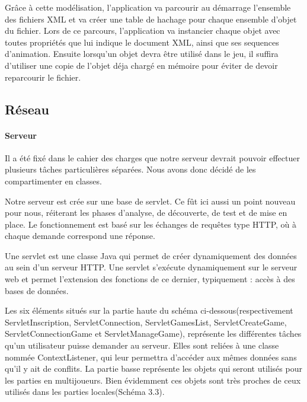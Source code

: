 		Grâce à cette modélisation, l'application va parcourir au démarrage l'ensemble des fichiers XML et va créer une table de hachage pour chaque ensemble d'objet du fichier. Lors de ce parcours, l'application va instancier chaque objet avec toutes propriétés que lui indique le document XML, ainsi que ses sequences d'animation. Ensuite lorsqu'un objet devra être utilisé dans le jeu, il suffira d'utiliser une copie de l'objet déja chargé en mémoire pour éviter de devoir reparcourir le fichier.


\subsection{Réseau}
		
	\paragraph{Serveur\\}
			
		Il a été fixé dans le cahier des charges que notre serveur devrait pouvoir
		effectuer plusieurs tâches particulières séparées. Nous avons donc décidé de
		les compartimenter en classes.
		
		Notre serveur est crée sur une base de servlet. Ce fût ici
		aussi un point nouveau pour nous, réiterant les phases d'analyse, de
		découverte, de test et de mise en place. Le fonctionnement est basé sur les
		échanges de requêtes type HTTP, où à chaque demande correspond une réponse. 
		
		Une servlet est une classe Java qui permet de créer dynamiquement des données
		au sein d'un serveur HTTP. Une servlet s'exécute dynamiquement sur le serveur
		web et permet l'extension des fonctions de ce dernier, typiquement : accès à
		des bases de données.
			
		Les six éléments situés sur la partie haute du schéma
		ci-dessous(respectivement ServletInscription, ServletConnection,
		ServletGamesList, ServletCreateGame, ServletConnectionGame et
		ServletManageGame), représente les différentes tâches qu'un utilisateur
		puisse demander au serveur. Elles sont reliées à une classe nommée
		ContextListener, qui leur permettra d'accéder aux mêmes données sans qu'il y
		ait de conflits. La partie basse représente les objets qui seront utilisés pour les parties en multijoueurs. 
		Bien évidemment ces objets sont très proches de ceux utilisés dans les parties
		locales(Schéma 3.3).
		
